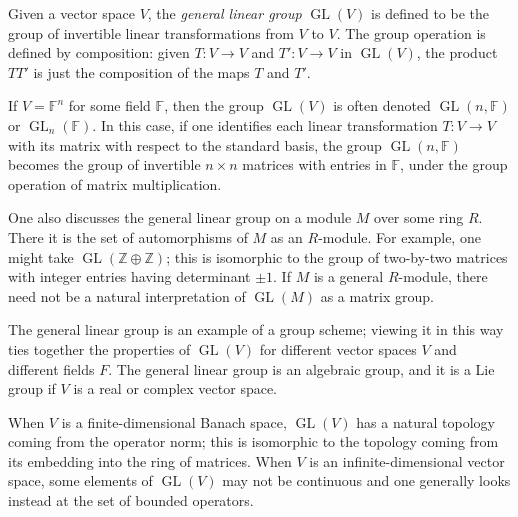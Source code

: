 \documentclass{article}
\newcommand{\GL}{{\operatorname{GL}}}
\begin{document}
Given a vector space $V$, the {\em general linear group} $\GL(V)$ is defined to be the group of invertible linear transformations from $V$ to $V$. The group operation is defined by composition: given $T: V \longrightarrow V$ and $T': V \longrightarrow V$ in $\GL(V)$, the product $TT'$ is just the composition of the maps $T$ and $T'$.

If $V = \mathbb{F}^n$ for some field $\mathbb{F}$, then the group $\GL(V)$ is often denoted $\GL(n,\mathbb{F})$ or $\GL_n(\mathbb{F})$. In this case, if one identifies each linear transformation $T: V \longrightarrow V$ with its matrix with respect to the standard basis, the group $\GL(n,\mathbb{F})$ becomes the group of invertible $n \times n$ matrices with entries in $\mathbb{F}$, under the group operation of matrix multiplication.

One also discusses the general linear group on a module $M$ over some ring $R$.  There it is the set of automorphisms of $M$ as an $R$-module.  For example, one might take $\GL(\mathbb{Z}\oplus\mathbb{Z})$; this is isomorphic to the group of two-by-two matrices with integer entries having determinant $\pm 1$.  If $M$ is a general $R$-module, there need not be a natural interpretation of $\GL(M)$ as a matrix group.

The general linear group is an example of a group scheme; viewing it in this way ties together the properties of $\GL(V)$ for different vector spaces $V$ and different fields $F$.  The general linear group is an algebraic group, and it is a Lie group if $V$ is a real or complex vector space. 

When $V$ is a finite-dimensional Banach space, $\GL(V)$ has a natural topology coming from the operator norm; this is isomorphic to the topology coming from its embedding into the ring of matrices.  When $V$ is an infinite-dimensional vector space, some elements of $\GL(V)$ may not be continuous and one generally looks instead at the set of bounded operators.
\end{document}
